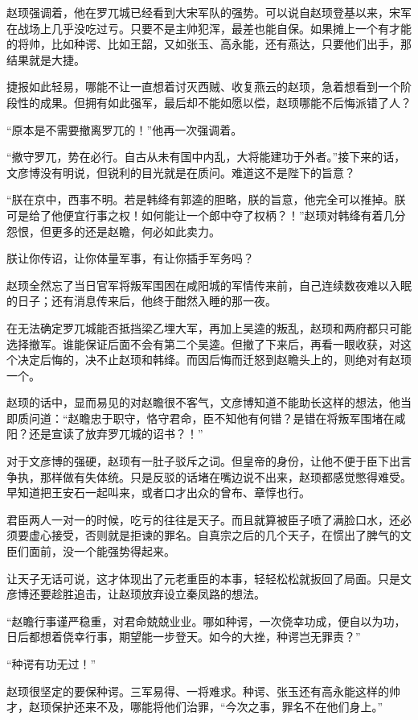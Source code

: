 赵顼强调着，他在罗兀城已经看到大宋军队的强势。可以说自赵顼登基以来，宋军在战场上几乎没吃过亏。只要不是主帅犯浑，最差也能自保。如果摊上一个有才能的将帅，比如种谔、比如王韶，又如张玉、高永能，还有燕达，只要他们出手，那结果就是大捷。

捷报如此轻易，哪能不让一直想着讨灭西贼、收复燕云的赵顼，急着想看到一个阶段性的成果。但拥有如此强军，最后却不能如愿以偿，赵顼哪能不后悔派错了人？

“原本是不需要撤离罗兀的！”他再一次强调着。

“撤守罗兀，势在必行。自古从未有国中内乱，大将能建功于外者。”接下来的话，文彦博没有明说，但锐利的目光就是在质问。难道这不是陛下的旨意？

“朕在京中，西事不明。若是韩绛有郭逵的胆略，朕的旨意，他完全可以推掉。朕可是给了他便宜行事之权！如何能让一个郎中夺了权柄？！”赵顼对韩绛有着几分怨恨，但更多的还是赵瞻，何必如此卖力。

朕让你传诏，让你体量军事，有让你插手军务吗？

赵顼全然忘了当日官军将叛军围困在咸阳城的军情传来前，自己连续数夜难以入眠的日子；还有消息传来后，他终于酣然入睡的那一夜。

在无法确定罗兀城能否抵挡梁乙埋大军，再加上吴逵的叛乱，赵顼和两府都只可能选择撤军。谁能保证后面不会有第二个吴逵。但撤了下来后，再看一眼收获，对这个决定后悔的，决不止赵顼和韩绛。而因后悔而迁怒到赵瞻头上的，则绝对有赵顼一个。

赵顼的话中，显而易见的对赵瞻很不客气，文彦博知道不能助长这样的想法，他当即质问道：“赵瞻忠于职守，恪守君命，臣不知他有何错？是错在将叛军围堵在咸阳？还是宣读了放弃罗兀城的诏书？！”

对于文彦博的强硬，赵顼有一肚子驳斥之词。但皇帝的身份，让他不便于臣下出言争执，那样做有失体统。只是反驳的话堵在嘴边说不出来，赵顼都感觉憋得难受。早知道把王安石一起叫来，或者口才出众的曾布、章惇也行。

君臣两人一对一的时候，吃亏的往往是天子。而且就算被臣子喷了满脸口水，还必须要虚心接受，否则就是拒谏的罪名。自真宗之后的几个天子，在惯出了脾气的文臣们面前，没一个能强势得起来。

让天子无话可说，这才体现出了元老重臣的本事，轻轻松松就扳回了局面。只是文彦博还要趁胜追击，让赵顼放弃设立秦凤路的想法。

“赵瞻行事谨严稳重，对君命兢兢业业。哪如种谔，一次侥幸功成，便自以为功，日后都想着侥幸行事，期望能一步登天。如今的大挫，种谔岂无罪责？”

“种谔有功无过！”

赵顼很坚定的要保种谔。三军易得、一将难求。种谔、张玉还有高永能这样的帅才，赵顼保护还来不及，哪能将他们治罪，“今次之事，罪名不在他们身上。”

